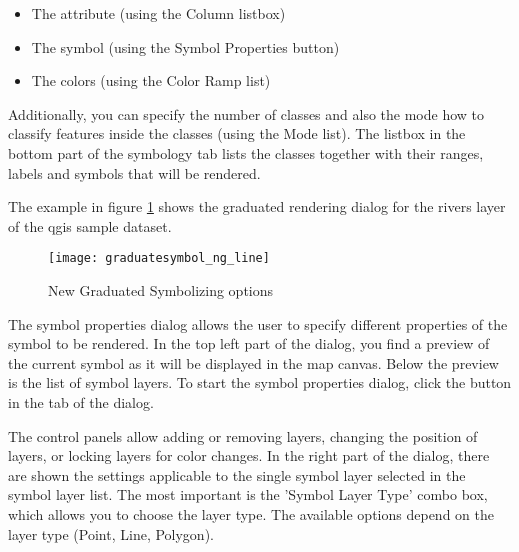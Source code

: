 \begin{itemize}
\item The attribute (using the Column listbox)
\item The symbol (using the Symbol Properties button)
\item The colors (using the Color Ramp list)
\end{itemize}

Additionally, you can specify the number of classes and also the mode how to 
classify features inside the classes (using the Mode list). The listbox in the 
bottom part of the symbology tab lists the classes together with their ranges, 
labels and symbols that will be rendered.

The example in figure \ref{fig:gradsymNG} shows the graduated rendering dialog 
for the rivers layer of the qgis sample dataset.

\begin{figure}[ht]
   \begin{center}
   \caption{New Graduated Symbolizing options \nixcaption}\label{fig:gradsymNG}\smallskip
   \texttt{[image: graduatesymbol\_ng\_line]}
\end{center}
\end{figure}


The symbol properties dialog allows the user to specify different properties of 
the symbol to be rendered. In the top left part of the dialog, you find a preview 
of the current symbol as it will be displayed in the map canvas. Below the preview 
is the list of symbol layers. To start the symbol properties dialog, click the 
 button in the  tab of the
 dialog. 

The control panels allow adding or removing layers, changing the position of layers, 
or locking layers for color changes. In the right part of the dialog, there are 
shown the settings applicable to the single symbol layer selected in the symbol 
layer list. The most important is the 'Symbol Layer Type' combo box, which allows 
you to choose the layer type. The available options depend on the layer type 
(Point, Line, Polygon). 

